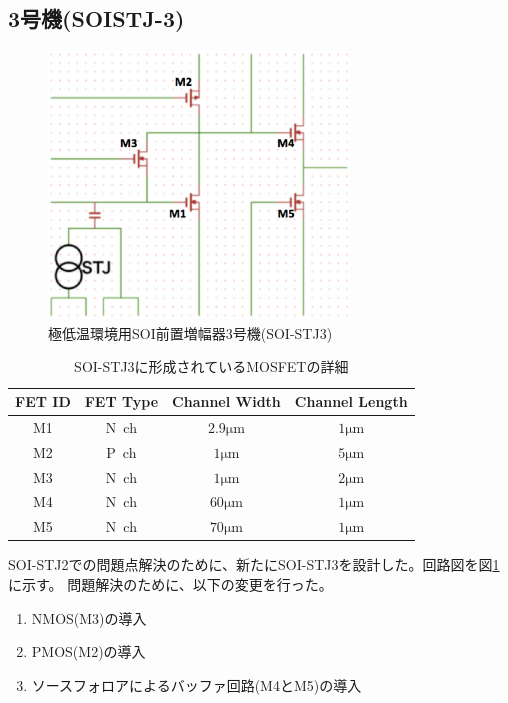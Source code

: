 	\subsection{3号機(SOISTJ-3)}
		\begin{figure}[htbp]
			\begin{center}
				\includegraphics[width=8.0cm]{./Chapter/Chapter3/Picture/SOISTJ3_circuit.eps}
				\caption{極低温環境用SOI前置増幅器3号機(SOI-STJ3)}
				\label{fig:SOISTJ3_circuit}
			\end{center}
		\end{figure}
		\begin{table}[htb]
			\begin{center}
				\begin{tabular}{| c | c | c | c |} \hline
					FET ID & FET Type & Channel Width & Channel Length \\ \hline \hline
					M1 & N\ ch & $2.9 \mathrm{\mu m}$ & $1 \mathrm{\mu m}$ \\ \hline
					M2 & P\ ch & $1 \mathrm{\mu m}$ & $5 \mathrm{\mu m}$ \\ \hline
					M3 & N\ ch & $1 \mathrm{\mu m}$ & $2 \mathrm{\mu m}$ \\ \hline
					M4 & N\ ch & $60 \mathrm{\mu m}$ & $1 \mathrm{\mu m}$ \\ \hline
					M5 & N\ ch & $70 \mathrm{\mu m}$ & $1 \mathrm{\mu m}$ \\ \hline
				\end{tabular}
				\caption{SOI-STJ3に形成されているMOSFETの詳細}
				\label{tab:SOISTJ3_detail}
			\end{center}
		\end{table}
		SOI-STJ2での問題点解決のために、新たにSOI-STJ3を設計した。回路図を図\ref{fig:SOISTJ3_circuit}に示す。
		問題解決のために、以下の変更を行った。
		\begin{enumerate}
			\item NMOS(M3)の導入
			\item PMOS(M2)の導入
			\item ソースフォロアによるバッファ回路(M4とM5)の導入
		\end{enumerate}
